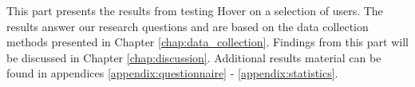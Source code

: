 This part presents the results from testing Hover on a selection of users. The results answer our research questions and are based on the data collection methods presented in Chapter \ref{chap:data_collection}. Findings from this part will be discussed in Chapter \ref{chap:discussion}. Additional results material can be found in appendices \ref{appendix:questionnaire} - \ref{appendix:statistics}.










